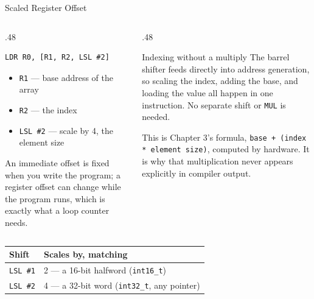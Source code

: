 \documentclass[9pt,aspectratio=169,xcolor=table]{beamer}
\begin{document}
\begin{frame}[fragile]{Scaled Register Offset}
	\begin{columns}[T]
		\begin{column}{.48\textwidth}
			\begin{lstlisting}[style=armasm, language=ARM]
	LDR R0, [R1, R2, LSL #2]
			\end{lstlisting}

			\vspace{3mm}
			{\small
				\begin{itemize}\itemsep1pt
					\item \texttt{R1} --- base address of the array
					\item \texttt{R2} --- the index
					\item \texttt{LSL \#2} --- scale by 4, the element size
			\end{itemize}}

			\vspace{2mm}
			{\small An immediate offset is fixed when you write the
				program; a register offset can change \alert{while the
					program runs}, which is exactly what a loop counter needs.}
		\end{column}
		\begin{column}{.48\textwidth}
			\begin{block}{Indexing without a multiply}
				The barrel shifter feeds directly into address generation,
				so scaling the index, adding the base, and loading the value
				all happen in \alert{one instruction}. No separate shift or
				\texttt{MUL} is needed.

				\vspace{2mm}
				This is Chapter 3's formula, \texttt{base + (index * element size)},
				computed by hardware. It is why that multiplication never
				appears explicitly in compiler output.
			\end{block}
		\end{column}
	\end{columns}

	\vspace{3mm}
	\begin{center}
		{\small
			\begin{tabular}{@{}l l@{}}
				\toprule
				\textbf{Shift} & \textbf{Scales by, matching} \\
				\midrule
				\texttt{LSL \#1} & 2 --- a 16-bit halfword (\texttt{int16\_t}) \\
				\texttt{LSL \#2} & 4 --- a 32-bit word (\texttt{int32\_t}, any pointer) \\
				\bottomrule
		\end{tabular}}
	\end{center}
\end{frame}
\end{document}
